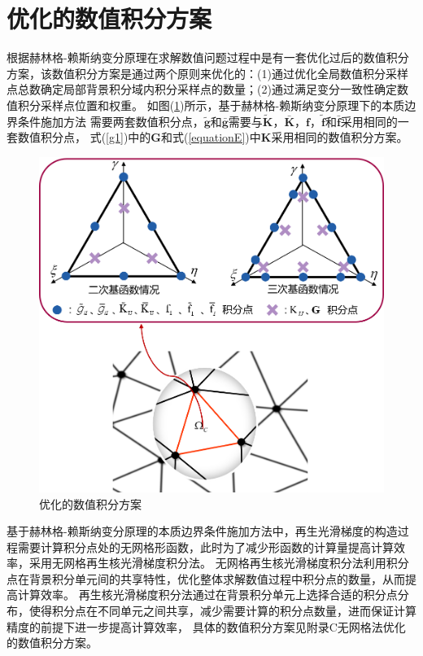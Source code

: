 \section{优化的数值积分方案}
根据赫林格-赖斯纳变分原理在求解数值问题过程中是有一套优化过后的数值积分方案\cite{wang2019}，该数值积分方案是通过两个原则来优化的：(1)通过优化全局数值积分采样点总数确定局部背景积分域内积分采样点的数量；(2)通过满足变分一致性确定数值积分采样点位置和权重。
如图(\ref{Eintegralscheme})所示，基于赫林格-赖斯纳变分原理下的本质边界条件施加方法
需要两套数值积分点，$\tilde{\pmb g}$和$\bar{\pmb g}$需要与$\tilde{\pmb{K}}$，$\bar{\pmb{K}}$，$\pmb{f}$，$\tilde{\pmb{f}}$和$\bar{\pmb{f}}$采用相同的一套数值积分点，
式(\ref{g1})中的$\pmb{G}$和式(\ref{equationE})中$\pmb{K}$采用相同的数值积分方案。\par
\begin{figure}[H]
    \centering
    \includegraphics[scale=0.6]{figure/EHR/Eintegralscheme.png}
    \caption{优化的数值积分方案}\label{Eintegralscheme}
\end{figure}
基于赫林格-赖斯纳变分原理的本质边界条件施加方法中，再生光滑梯度的构造过程需要计算积分点处的无网格形函数，此时为了减少形函数的计算量提高计算效率，采用无网格再生核光滑梯度积分法。
无网格再生核光滑梯度积分法利用积分点在背景积分单元间的共享特性，优化整体求解数值过程中积分点的数量，从而提高计算效率。
再生核光滑梯度积分法通过在背景积分单元上选择合适的积分点分布，使得积分点在不同单元之间共享，减少需要计算的积分点数量，进而保证计算精度的前提下进一步提高计算效率，
具体的数值积分方案见附录C无网格法优化的数值积分方案。
